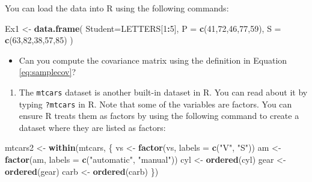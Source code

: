 \documentclass[
]{book}
\newenvironment{Shaded}{\begin{snugshade}}{\end{snugshade}}
\newcommand{\AttributeTok}[1]{\textcolor[rgb]{0.13,0.29,0.53}{#1}}
\newcommand{\DecValTok}[1]{\textcolor[rgb]{0.00,0.00,0.81}{#1}}
\newcommand{\FunctionTok}[1]{\textcolor[rgb]{0.13,0.29,0.53}{\textbf{#1}}}
\newcommand{\NormalTok}[1]{#1}
\newcommand{\OtherTok}[1]{\textcolor[rgb]{0.56,0.35,0.01}{#1}}
\newcommand{\SpecialCharTok}[1]{\textcolor[rgb]{0.81,0.36,0.00}{\textbf{#1}}}
\newcommand{\StringTok}[1]{\textcolor[rgb]{0.31,0.60,0.02}{#1}}
\providecommand{\tightlist}{%
  \setlength{\itemsep}{0pt}\setlength{\parskip}{0pt}}
\theoremstyle{definition}
\theoremstyle{definition}
\theoremstyle{definition}
\theoremstyle{definition}
\theoremstyle{remark}
\begin{document}
You can load the data into R using the following commands:

\begin{Shaded}
\begin{Highlighting}[]
\NormalTok{Ex1 }\OtherTok{\textless{}{-}} \FunctionTok{data.frame}\NormalTok{(}
  \AttributeTok{Student=}\NormalTok{LETTERS[}\DecValTok{1}\SpecialCharTok{:}\DecValTok{5}\NormalTok{],}
  \AttributeTok{P =} \FunctionTok{c}\NormalTok{(}\DecValTok{41}\NormalTok{,}\DecValTok{72}\NormalTok{,}\DecValTok{46}\NormalTok{,}\DecValTok{77}\NormalTok{,}\DecValTok{59}\NormalTok{),}
  \AttributeTok{S =} \FunctionTok{c}\NormalTok{(}\DecValTok{63}\NormalTok{,}\DecValTok{82}\NormalTok{,}\DecValTok{38}\NormalTok{,}\DecValTok{57}\NormalTok{,}\DecValTok{85}\NormalTok{)}
\NormalTok{  )}
\end{Highlighting}
\end{Shaded}

\begin{itemize}
\tightlist
\item
  Can you compute the covariance matrix using the definition in Equation \eqref{eq:samplecov}?
\end{itemize}

\begin{enumerate}
\def\labelenumi{\arabic{enumi}.}
\setcounter{enumi}{2}
\tightlist
\item
  The \texttt{mtcars} dataset is another built-in dataset in R. You can read about it by typing \texttt{?mtcars} in R. Note that some of the variables are factors. You can ensure R treats them as factors by using the following command to create a dataset where they are listed as factors:
\end{enumerate}

\begin{Shaded}
\begin{Highlighting}[]
\NormalTok{mtcars2 }\OtherTok{\textless{}{-}} \FunctionTok{within}\NormalTok{(mtcars, \{}
\NormalTok{   vs }\OtherTok{\textless{}{-}} \FunctionTok{factor}\NormalTok{(vs, }\AttributeTok{labels =} \FunctionTok{c}\NormalTok{(}\StringTok{"V"}\NormalTok{, }\StringTok{"S"}\NormalTok{))}
\NormalTok{   am }\OtherTok{\textless{}{-}} \FunctionTok{factor}\NormalTok{(am, }\AttributeTok{labels =} \FunctionTok{c}\NormalTok{(}\StringTok{"automatic"}\NormalTok{, }\StringTok{"manual"}\NormalTok{))}
\NormalTok{   cyl  }\OtherTok{\textless{}{-}} \FunctionTok{ordered}\NormalTok{(cyl)}
\NormalTok{   gear }\OtherTok{\textless{}{-}} \FunctionTok{ordered}\NormalTok{(gear)}
\NormalTok{   carb }\OtherTok{\textless{}{-}} \FunctionTok{ordered}\NormalTok{(carb)}
\NormalTok{\})}
\end{Highlighting}
\end{Shaded}
\end{document}
